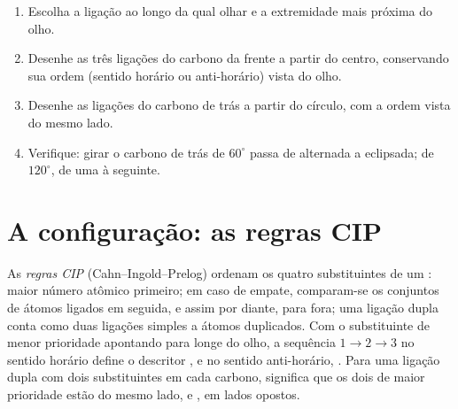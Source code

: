 \begin{method}\label{met:b1:stereochemistry-in-depth:newman-from-cram}
\begin{enumerate}
  \item Escolha a ligação ao longo da qual olhar e a extremidade mais
        próxima do olho.
  \item Desenhe as três ligações do carbono da frente a partir do centro,
        conservando sua ordem (sentido horário ou anti-horário) vista do
        olho.
  \item Desenhe as ligações do carbono de trás a partir do círculo, com a
        ordem vista do mesmo lado.
  \item Verifique: girar o carbono de trás de $60^\circ$ passa de
        alternada a eclipsada; de $120^\circ$, de uma  à seguinte.
\end{enumerate}
\end{method}

\section{A configuração: as regras CIP}

\begin{definition}\label{def:b1:stereochemistry-in-depth:cip}
As \emph{regras CIP} (Cahn--Ingold--Prelog) ordenam os
quatro substituintes de um : maior número atômico
primeiro; em caso de empate, comparam-se os conjuntos de átomos ligados
em seguida, e assim por diante, para fora; uma ligação dupla conta como
duas ligações simples a átomos duplicados. Com o substituinte de menor
prioridade apontando para longe do olho, a sequência $1 \to 2 \to 3$ no
sentido horário define o descritor , e no sentido anti-horário,
. Para uma ligação dupla com dois substituintes em cada carbono,
 significa que os dois de maior prioridade estão do mesmo lado, e
, em lados opostos.
\end{definition}

